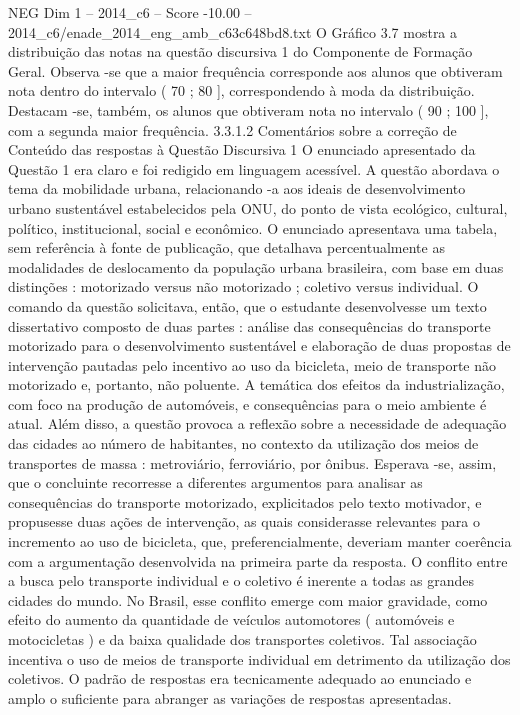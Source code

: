 \begin{textsample}{NEG Dim 1 – 2014\_c6 – Score -10.00 – 2014\_c6/enade\_2014\_eng\_amb\_c63c648bd8.txt}
O Gráfico 3.7 mostra a distribuição das notas na questão discursiva 1 do Componente de Formação Geral.
Observa -se que a maior frequência corresponde aos alunos que obtiveram nota dentro do intervalo ( 70 ; 80 ], correspondendo à moda da distribuição.
Destacam -se, também, os alunos que obtiveram nota no intervalo ( 90 ; 100 ], com a segunda maior frequência. 3.3.1.2 Comentários sobre a correção de Conteúdo das respostas à Questão Discursiva 1 O enunciado apresentado da Questão 1 era claro e foi redigido em linguagem acessível.
A questão abordava o tema da mobilidade urbana, relacionando -a aos ideais de desenvolvimento urbano sustentável estabelecidos pela ONU, do ponto de vista ecológico, cultural, político, institucional, social e econômico.
O enunciado apresentava uma tabela, sem referência à fonte de publicação, que detalhava percentualmente as modalidades de deslocamento da população urbana brasileira, com base em duas distinções : motorizado versus não motorizado ; coletivo versus individual.
O comando da questão solicitava, então, que o estudante desenvolvesse um texto dissertativo composto de duas partes : análise das consequências do transporte motorizado para o desenvolvimento sustentável e elaboração de duas propostas de intervenção pautadas pelo incentivo ao uso da bicicleta, meio de transporte não motorizado e, portanto, não poluente.
A temática dos efeitos da industrialização, com foco na produção de automóveis, e consequências para o meio ambiente é atual.
Além disso, a questão provoca a reflexão sobre a necessidade de adequação das cidades ao número de habitantes, no contexto da utilização dos meios de transportes de massa : metroviário, ferroviário, por ônibus.
Esperava -se, assim, que o concluinte recorresse a diferentes argumentos para analisar as consequências do transporte motorizado, explicitados pelo texto motivador, e propusesse duas ações de intervenção, as quais considerasse relevantes para o incremento ao uso de bicicleta, que, preferencialmente, deveriam manter coerência com a argumentação desenvolvida na primeira parte da resposta.
O conflito entre a busca pelo transporte individual e o coletivo é inerente a todas as grandes cidades do mundo.
No Brasil, esse conflito emerge com maior gravidade, como efeito do aumento da quantidade de veículos automotores ( automóveis e motocicletas ) e da baixa qualidade dos transportes coletivos.
Tal associação incentiva o uso de meios de transporte individual em detrimento da utilização dos coletivos.
O padrão de respostas era tecnicamente adequado ao enunciado e amplo o suficiente para abranger as variações de respostas apresentadas.

\end{textsample}

